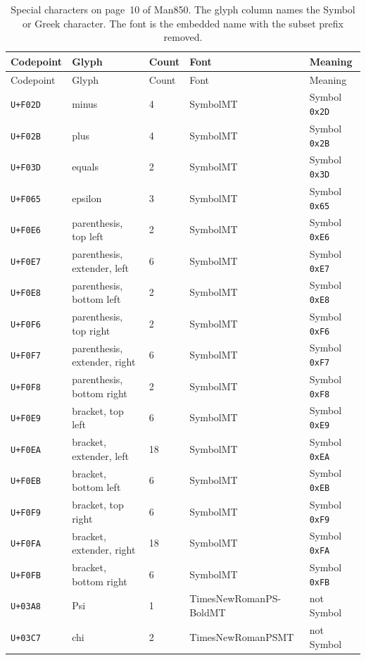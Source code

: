 \documentclass[11pt]{article}
\begin{document}
\begin{longtable}{@{}p{}p{}p{}p{}p{}@{}}
\caption{Special characters on page~10 of Man850. The glyph column names
the Symbol or Greek character. The font is the embedded name with the
subset prefix removed.}
\label{tab:pua}\\
\toprule
Codepoint & Glyph & Count & Font & Meaning \\
\midrule
\endfirsthead
\toprule
Codepoint & Glyph & Count & Font & Meaning \\
\midrule
\endhead
\texttt{U+F02D} & minus & 4 & SymbolMT & Symbol \texttt{0x2D} \\
\texttt{U+F02B} & plus & 4 & SymbolMT & Symbol \texttt{0x2B} \\
\texttt{U+F03D} & equals & 2 & SymbolMT & Symbol \texttt{0x3D} \\
\texttt{U+F065} & epsilon & 3 & SymbolMT & Symbol \texttt{0x65} \\
\texttt{U+F0E6} & parenthesis, top left & 2 & SymbolMT & Symbol \texttt{0xE6} \\
\texttt{U+F0E7} & parenthesis, extender, left & 6 & SymbolMT & Symbol \texttt{0xE7} \\
\texttt{U+F0E8} & parenthesis, bottom left & 2 & SymbolMT & Symbol \texttt{0xE8} \\
\texttt{U+F0F6} & parenthesis, top right & 2 & SymbolMT & Symbol \texttt{0xF6} \\
\texttt{U+F0F7} & parenthesis, extender, right & 6 & SymbolMT & Symbol \texttt{0xF7} \\
\texttt{U+F0F8} & parenthesis, bottom right & 2 & SymbolMT & Symbol \texttt{0xF8} \\
\texttt{U+F0E9} & bracket, top left & 6 & SymbolMT & Symbol \texttt{0xE9} \\
\texttt{U+F0EA} & bracket, extender, left & 18 & SymbolMT & Symbol \texttt{0xEA} \\
\texttt{U+F0EB} & bracket, bottom left & 6 & SymbolMT & Symbol \texttt{0xEB} \\
\texttt{U+F0F9} & bracket, top right & 6 & SymbolMT & Symbol \texttt{0xF9} \\
\texttt{U+F0FA} & bracket, extender, right & 18 & SymbolMT & Symbol \texttt{0xFA} \\
\texttt{U+F0FB} & bracket, bottom right & 6 & SymbolMT & Symbol \texttt{0xFB} \\
\texttt{U+03A8} & Psi & 1 &
{\raggedright\ttfamily TimesNewRomanPS-\allowbreak BoldMT} & not Symbol \\
\texttt{U+03C7} & chi & 2 &
{\raggedright\ttfamily TimesNewRoman\allowbreak PSMT} & not Symbol \\
\bottomrule
\end{longtable}
\end{document}
